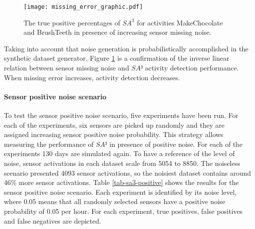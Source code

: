 \begin{figure}[htbp]
\centering
\texttt{[image: missing\_error\_graphic.pdf]}
    \caption{The true positive percentages of $SA^3$ for activities MakeChocolate and BrushTeeth in presence of increasing sensor missing noise.}
    \label{fig:sa3-missing}
\end{figure}

Taking into account that noise generation is probabilistically accomplished in the synthetic dataset generator, Figure \ref{fig:sa3-missing} is a confirmation of the inverse linear relation between sensor missing noise and $SA³$ activity detection performance. When missing error increases, activity detection decreases. 

\paragraph*{Sensor positive noise scenario}

To test the sensor positive noise scenario, five experiments have been run. For each of the experiments, six sensors are picked up randomly and they are assigned increasing sensor positive noise probability. This strategy allows measuring the performance of $SA³$ in presence of positive noise. For each of the experiments 130 days are simulated again. To have a reference of the level of noise, sensor activations in each dataset scale from 5054 to 8850. The noiseless scenario presented 4093 sensor activations, so the noisiest dataset contains around 46\% more sensor activations. Table \ref{tab-sa3-positive} shows the results for the sensor positive noise scenario. Each experiment is identified by its noise level, where 0.05 means that all randomly selected sensors have a positive noise probability of 0.05 per hour. For each experiment, true positives, false positives and false negatives are depicted.

